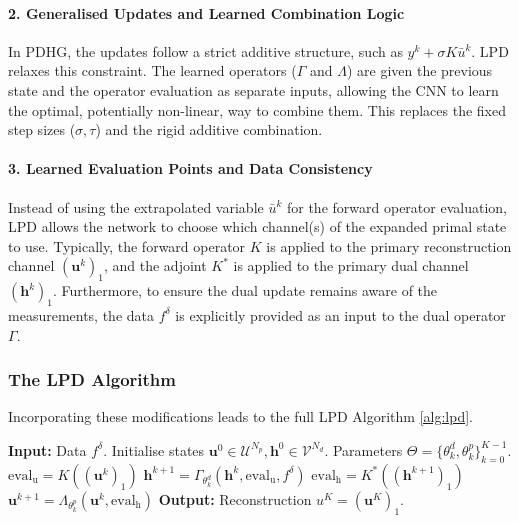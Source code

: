 \paragraph{2. Generalised Updates and Learned Combination Logic}
In PDHG, the updates follow a strict additive structure, such as $y^k + \sigma K \bar{u}^k$. LPD relaxes this constraint. The learned operators ($\Gamma$ and $\Lambda$) are given the previous state and the operator evaluation as separate inputs, allowing the CNN to learn the optimal, potentially non-linear, way to combine them. This replaces the fixed step sizes ($\sigma, \tau$) and the rigid additive combination.

\paragraph{3. Learned Evaluation Points and Data Consistency}
Instead of using the extrapolated variable $\bar{u}^k$ for the forward operator evaluation, LPD allows the network to choose which channel(s) of the expanded primal state to use. Typically, the forward operator $K$ is applied to the primary reconstruction channel $(\mathbf{u}^k)_1$, and the adjoint $K^*$ is applied to the primary dual channel $(\mathbf{h}^k)_1$. Furthermore, to ensure the dual update remains aware of the measurements, the data $f^\delta$ is explicitly provided as an input to the dual operator $\Gamma$.

\subsubsection{The LPD Algorithm}
Incorporating these modifications leads to the full LPD Algorithm \ref{alg:lpd}.

\begin{algorithm}
\caption{Learned Primal-Dual (LPD)}\label{alg:lpd}
\begin{algorithmic}
\State \textbf{Input:} Data $f^\delta$. Initialise states $\mathbf{u}^0 \in \mathcal{U}^{N_p}, \mathbf{h}^0 \in \mathcal{V}^{N_d}$. Parameters $\Theta = \{ \theta_k^d, \theta_k^p \}_{k=0}^{K-1}$.
\State $\text{eval}_\text{u} = K ((\mathbf{u}^k)_1)$
\State $\mathbf{h}^{k+1} = \Gamma_{\theta_k^d}(\mathbf{h}^k, \text{eval}_\text{u}, f^\delta)$ 
\State $\text{eval}_\text{h} = K^* ((\mathbf{h}^{k+1})_1)$
\State $\mathbf{u}^{k+1} = \Lambda_{\theta_k^p}(\mathbf{u}^k, \text{eval}_\text{h})$ 
\EndFor
\State \textbf{Output:} Reconstruction $u^K = (\mathbf{u}^K)_1$.
\end{algorithmic}
\end{algorithm}

